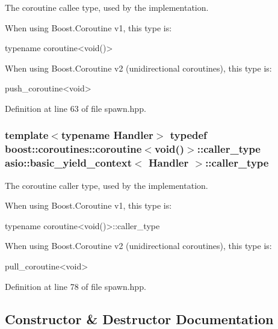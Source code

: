 The coroutine callee type, used by the implementation. 

When using Boost.\+Coroutine v1, this type is\+: 
\begin{DoxyCode}
\textcolor{keyword}{typename} coroutine<void()> 
\end{DoxyCode}
 When using Boost.\+Coroutine v2 (unidirectional coroutines), this type is\+: 
\begin{DoxyCode}
push\_coroutine<void> 
\end{DoxyCode}
 

Definition at line 63 of file spawn.\+hpp.

\hypertarget{classasio_1_1basic__yield__context_a3f865e7e2e46345effce8163336f1c8e}{}
\subsubsection[{caller\+\_\+type}]{\setlength{\rightskip}{0pt plus 5cm}template$<$typename Handler$>$ typedef boost\+::coroutines\+::coroutine$<$void()$>$\+::{\bf caller\+\_\+type} {\bf asio\+::basic\+\_\+yield\+\_\+context}$<$ Handler $>$\+::{\bf caller\+\_\+type}}\label{classasio_1_1basic__yield__context_a3f865e7e2e46345effce8163336f1c8e}


The coroutine caller type, used by the implementation. 

When using Boost.\+Coroutine v1, this type is\+: 
\begin{DoxyCode}
\textcolor{keyword}{typename} coroutine<void()>::caller\_type 
\end{DoxyCode}
 When using Boost.\+Coroutine v2 (unidirectional coroutines), this type is\+: 
\begin{DoxyCode}
pull\_coroutine<void> 
\end{DoxyCode}
 

Definition at line 78 of file spawn.\+hpp.



\subsection{Constructor \& Destructor Documentation}
\hypertarget{classasio_1_1basic__yield__context_a9f14fbbf643163ee3152972d56907ede}{}
